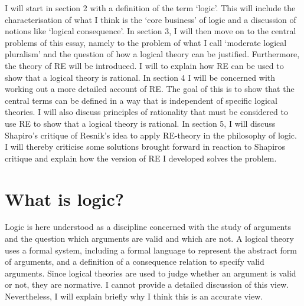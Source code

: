 \documentclass{article}
\begin{document}
I will start in section 2 with a definition of the term `logic'. This will include the characterisation of what I think is the `core business' of logic and a discussion of notions like `logical consequence'. In section 3, I will then move on to the central problems of this essay, namely to the problem of what I call `moderate logical pluralism' and the question of how a logical theory can be justified. Furthermore, the theory of RE will be introduced. I will to explain how RE can be used to show that a logical theory is rational. In section 4 I will be concerned with working out a more detailed account of RE. The goal of this is to show that the central terms can be defined in a way that is independent of specific logical theories. I will also discuss principles of rationality that must be considered to use RE to show that a logical theory is rational. In section 5, I will discuss Shapiro's critique of Resnik's idea to apply RE-theory in the philosophy of logic. I will thereby criticise some solutions brought forward in reaction to Shapiros critique and explain how the version of RE I developed solves the problem.

\section{What is logic?}\label{sec:logic}
Logic is here understood as a discipline concerned with the study of arguments and the question which arguments are valid and which are not. A logical theory uses a formal system, including a formal language to represent the abstract form of arguments, and a definition of a consequence relation to specify valid arguments. Since logical theories are used to judge whether an argument is valid or not, they are normative. I cannot provide a detailed discussion of this view. Nevertheless, I will explain briefly why I think this is an accurate view.
\end{document}

